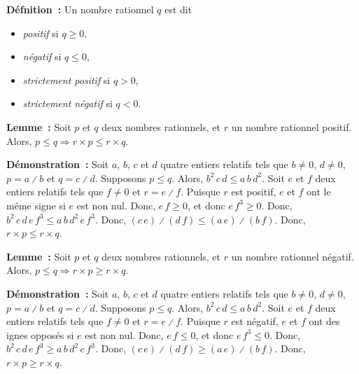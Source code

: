     \done

\medskip

\noindent\textbf{Défnition :} Un nombre rationnel $q$ est dit
    \begin{itemize}[nosep]
        \item \emph{positif} si $q \geq 0$,
        \item \emph{négatif} si $q \leq 0$,
        \item \emph{strictement positif} si $q > 0$,
        \item \emph{strictement négatif} si $q < 0$.
    \end{itemize}

\medskip

\noindent\textbf{Lemme :} Soit $p$ et $q$ deux nombres rationnels, et $r$ un nombre rationnel positif. 
    Alors, $p \leq q \Rightarrow r \times p \leq r \times q$.

\medskip

\noindent\textbf{Démonstration :}
    Soit $a$, $b$, $c$ et $d$ quatre entiers relatifs tels que $b \neq 0$, $d \neq 0$, $p = a \divslash b$ et $q = c \divslash d$.
    Supposons $p \leq q$.
    Alors, $b^2 \, c \, d \leq a \, b \, d^2$.
    Soit $e$ et $f$ deux entiers relatifs tels que $f \neq 0$ et $r = e \divslash f$.
    Puisque $r$ est positif, $e$ et $f$ ont le même signe si $e$ est non nul. 
    Donc, $e \, f \geq 0$, et donc $e \, f^3 \geq 0$.
    Donc, $b^2 \, c \, d \, e \, f^3 \leq a \, b \, d^2 \, e \, f^3$. 
    Donc, $(c \, e) \divslash (d \, f) \leq (a \, e) \divslash (b \, f)$. 
    Donc, $r \times p \leq r \times q$.

    \done

\medskip

\noindent\textbf{Lemme :} Soit $p$ et $q$ deux nombres rationnels, et $r$ un nombre rationnel négatif. 
    Alors, $p \leq q \Rightarrow r \times p \geq r \times q$.

\medskip

\noindent\textbf{Démonstration :}
    Soit $a$, $b$, $c$ et $d$ quatre entiers relatifs tels que $b \neq 0$, $d \neq 0$, $p = a \divslash b$ et $q = c \divslash d$.
    Supposons $p \leq q$.
    Alors, $b^2 \, c \, d \leq a \, b \, d^2$.
    Soit $e$ et $f$ deux entiers relatifs tels que $f \neq 0$ et $r = e \divslash f$.
    Puisque $r$ est négatif, $e$ et $f$ ont des ignes opposés si $e$ est non nul. 
    Donc, $e \, f \leq 0$, et donc $e \, f^3 \leq 0$.
    Donc, $b^2 \, c \, d \, e \, f^3 \geq a \, b \, d^2 \, e \, f^3$. 
    Donc, $(c \, e) \divslash (d \, f) \geq (a \, e) \divslash (b \, f)$. 
    Donc, $r \times p \geq r \times q$.

